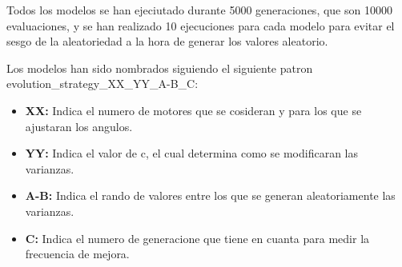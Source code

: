 \documentclass[12pt, spanish, pdftex]{UC3M_document}
\begin{document}
Todos los modelos se han ejeciutado durante 5000 generaciones, que son 10000 evaluaciones, y se han realizado 10 ejecuciones para cada modelo para evitar el sesgo de la aleatoriedad a la hora de generar los valores aleatorio.

Los modelos han sido nombrados siguiendo el siguiente patron evolution\_strategy\_XX\_YY\_A-B\_C:
\begin{itemize}
	\item \textbf{XX:} Indica el numero de motores que se cosideran y para los que se ajustaran los angulos.
	\item \textbf{YY:} Indica el valor de c, el cual determina como se modificaran las varianzas.
	\item \textbf{A-B:} Indica el rando de valores entre los que se generan aleatoriamente las varianzas.
	\item \textbf{C:} Indica el numero de generacione que tiene en cuanta para medir la frecuencia de mejora.
\end{itemize}
\end{document}
